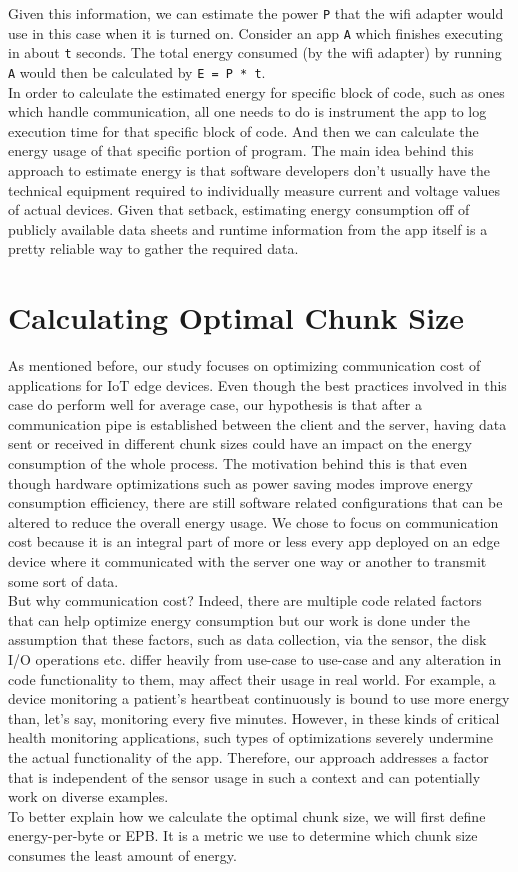 Given this information, we can estimate the power \texttt{P} that the wifi adapter would use in this case when it is 
turned on. Consider an app \texttt{A} which finishes executing in about \texttt{t} seconds. The total energy 
consumed (by the wifi adapter) by running \texttt{A} would then be calculated by \texttt{E = P * t}. \\
In order to calculate the estimated energy for specific block of code, such as ones which handle communication, all one 
needs to do is instrument the app to log execution time for that specific block of code. And then we can 
calculate the energy usage of that specific portion of program. The main idea behind this approach to 
estimate energy is that software developers don't usually have the technical equipment required to 
individually measure current and voltage values of actual devices. Given that setback, estimating energy 
consumption off of publicly available data sheets and runtime information from the app itself is a 
pretty reliable way to gather the required data. \\
\section{Calculating Optimal Chunk Size}
As mentioned before, our study focuses on optimizing communication cost of applications for IoT edge devices. 
Even though the best practices involved in this case do perform well for average case, our hypothesis 
is that after a communication pipe is established between the client and the server, having data sent or 
received in different chunk sizes could have an impact on the energy consumption of the whole process. 
The motivation behind this is that even though hardware optimizations such as power saving modes improve 
energy consumption efficiency, there are still software related configurations that can be altered to reduce 
the overall energy usage. We chose to focus on communication cost because it is an integral part of more or less 
every app deployed on an edge device where it communicated with the server one way or another to transmit 
some sort of data. \\
But why communication cost? Indeed, there are multiple code related factors that can help optimize energy 
consumption but our work is done under the assumption that these factors, such as data collection, via the 
sensor, the disk I/O operations etc. differ heavily from use-case to use-case and any alteration in code 
functionality to them, may affect their usage in real world. For example, a device monitoring a patient's 
heartbeat continuously is bound to use more energy than, let's say, monitoring every five minutes. 
However, in these kinds of critical health monitoring applications, such types of optimizations severely undermine the actual 
functionality of the app. Therefore, our approach addresses a factor that is independent of the sensor 
usage in such a context and can potentially work on diverse examples. \\
To better explain how we calculate the optimal chunk size, we will first define energy-per-byte or EPB. 
It is a metric we use to determine which chunk size consumes the least amount of energy. \\

